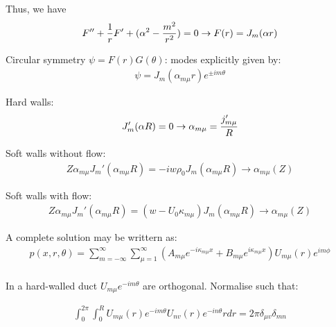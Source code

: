\documentclass{Note}
\begin{document}
Thus, we  have
\begin{equation}
\begin{aligned}
F''+{1\over r} F'+(\alpha^2-{m^2\over r^2})=0  \rightarrow F(r)=J_m(\alpha r)
\end{aligned}
\end{equation}

Circular symmetry $\psi=F(r)G(\theta)$: modes explicitly given by:
\begin{equation}
\begin{aligned}
\psi=J_m(\alpha_{m\mu} r)e^{\pm i m \theta}
\end{aligned}
\end{equation}

Hard walls:
\begin{equation}
\begin{aligned}
J_m'(\alpha R)=0 \rightarrow \alpha_{m\mu}={{j'_{m\mu}}\over R}
\end{aligned}
\end{equation}

Soft walls without flow:
\begin{equation}
\begin{aligned}
Z\alpha_{m\mu} J_m'(\alpha_{m\mu} R)=-iw\rho_0J_m(\alpha_{m\mu} R) \rightarrow \alpha_{m\mu}(Z)
\end{aligned}
\end{equation}

Soft walls with flow:
\begin{equation}
\begin{aligned}
Z\alpha_{m\mu} J_m'(\alpha_{m\mu} R)=(w-U_0\kappa_{m\mu})J_m(\alpha_{m\mu} R) \rightarrow \alpha_{m\mu}(Z)
\end{aligned}
\end{equation}

A complete solution may be writtern as:
\begin{equation}
\begin{aligned}
p(x,r,\theta)=\sum_{m=-\infty}^\infty \sum_{\mu=1}^\infty (A_{m\mu}e^{-i\kappa_{m\mu}x}+B_{m\mu}e^{i\kappa_{m\mu}x})U_{m\mu}(r)e^{im\phi}\\
\end{aligned}
\end{equation}

In a hard-walled duct $U_{m\mu}e^{-im\theta}$ are orthogonal. Normalise such that:

\begin{equation}
\begin{aligned}
\int_0^{2\pi}\int_0^R U_{m\mu}(r)e^{-im\theta}U_{nv}(r)e^{-in\theta}rdr=2\pi \delta_{\mu v}\delta_{mn}
\end{aligned}
\end{equation}
\end{document}
